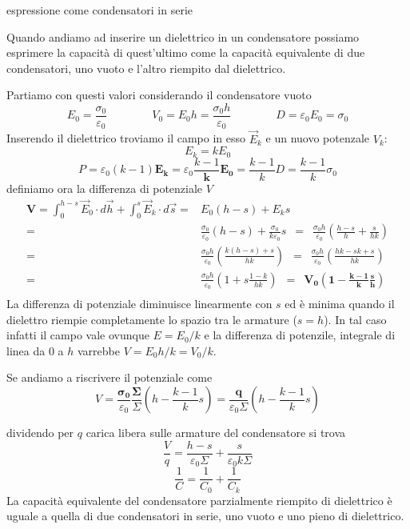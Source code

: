 \documentclass[x11names]{report}
\newcommand{\esempio}[2]{
	\begin{es}{#1}
		#2
	\end{es}
}
\begin{document}
\esempio{espressione come condensatori in serie}{
	Quando andiamo ad inserire un dielettrico in un condensatore possiamo esprimere la capacità di quest'ultimo come la capacità equivalente di due condensatori, uno vuoto e l'altro riempito dal dielettrico.
	
	Partiamo con questi valori considerando il condensatore vuoto
	\[
	E_0 = \frac{\sigma_0}{\varepsilon_0} \qquad \qquad V_0 = E_0 h = \frac{\sigma_0 h}{\varepsilon_0} \qquad \qquad D = \varepsilon_0 E_0 = \sigma_0
	\]
	Inserendo il dielettrico troviamo il campo in esso \(\vec{E}_k\) e un nuovo potenzale \(V_k\):
	\[
	E_k = kE_0
	\]
	\[
	P = \varepsilon_0(k-1)\boldsymbol{E_k} = \varepsilon_0 \frac{k-1}{\boldsymbol{k}}\boldsymbol{E_0} = \frac{k-1}{k}D = \frac{k-1}{k}\sigma_0
	\]
	definiamo ora la differenza di potenziale \(V\)
	\begin{align*}
		\boldsymbol{V= }\int_{0}^{h-s}\vec{E}_0\cdot d\vec{h} + \int_{0}^{s}\vec{E}_k\cdot d\vec{s} =& E_0(h-s) + E_ks \\
		=& \frac{\sigma_0}{\varepsilon_0}(h-s) + \frac{\sigma_0}{k\varepsilon_0}s \;\  = \;\ \frac{\sigma_0 h}{\varepsilon_0} \left(\frac{h-s}{h} + \frac{s}{hk}\right)\\
		=& \frac{\sigma_0 h}{\varepsilon_0} \left(\frac{k(h-s) + s}{hk} \right) \;\ = \;\ \frac{\sigma_0 h}{\varepsilon_0} \left(\frac{hk - sk +s}{hk} \right) \\
		=& \frac{\sigma_0 h}{\varepsilon_0} \left(1 + s\frac{1-k}{hk} \right) \;\ \boldsymbol{=} \;\ \boldsymbol{V_0\left(1 - \frac{k-1}{k}\frac{s}{h} \right)} \\
	\end{align*}
	La differenza di potenziale diminuisce linearmente con \(s\) ed è minima quando il dielettro riempie completamente lo spazio tra le armature (\(s = h\)). In tal caso infatti il campo vale ovunque \(E = E_0/k\) e la differenza di potenzile, integrale di linea da \(0\) a \(h\) varrebbe \(V = E_0h/k = V_0/k\).
	
	Se andiamo a riscrivere il potenziale come
	\[
	V = \frac{\boldsymbol{\sigma_0}}{\varepsilon_0}\frac{\boldsymbol{\Sigma}}{\Sigma}\left(h - \frac{k-1}{k}s\right) = \frac{\boldsymbol{q}}{\varepsilon_0\Sigma}\left(h-\frac{k-1}{k}s\right)
	\]
	
	dividendo per \(q\) carica libera sulle armature del condensatore si trova
	\[
	\frac{V}{q} = \frac{h-s}{\varepsilon_0 \Sigma} + \frac{s}{\varepsilon_0 k \Sigma}
	\]
	\[
	\frac{1}{C} = \frac{1}{C_0} + \frac{1}{C_k}
	\]
	La capacità equivalente del condensatore parzialmente riempito di dielettrico è uguale a quella di due condensatori in serie, uno vuoto e uno pieno di dielettrico.}
\end{document}

